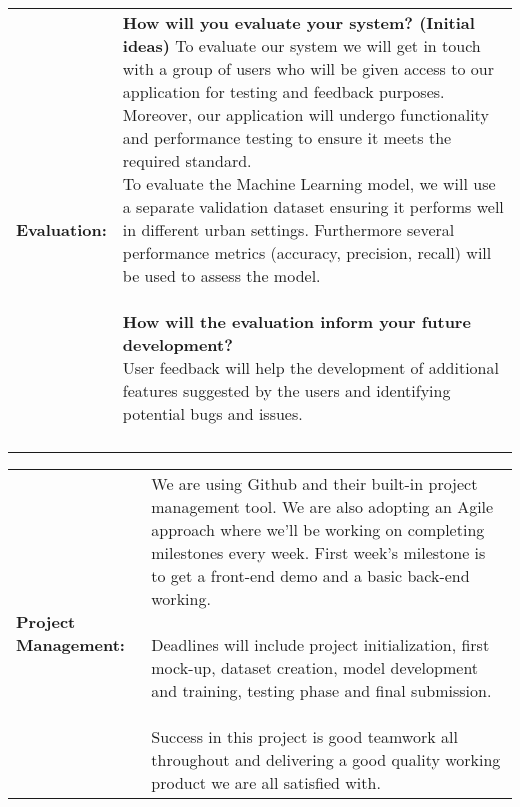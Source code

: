 \documentclass[a4paper,12pt]{article}
\begin{document}
\begin{tabular}{|p{}|p{}|}
    \hline
   \textbf{Evaluation:} & \parbox{0.65\textwidth}{\vspace{0.3cm}\textbf{How will you evaluate your system? (Initial ideas)} \vspace{0.3cm}
   To evaluate our system we will get in touch with a group of users who will be given access to our application for testing and feedback purposes. Moreover, our application will undergo functionality and performance testing to ensure it meets the required standard.
   \\
   To evaluate the Machine Learning model, we will use a separate validation dataset ensuring it performs well in different urban settings. Furthermore several performance metrics (accuracy, precision, recall) will be used to assess the model.
   \\
   \\
   \vspace{0.3cm}\textbf{ How will the evaluation inform your future development?}\vspace{0.3cm}
   \\
   User feedback will help the development of additional features suggested by the users and identifying potential bugs and issues.
   \\
   \\
    } \\
   \hline
\end{tabular}

\vspace{0.5cm}

\centering
\begin{tabular}{|p{}|p{}|}
    \hline
    \textbf{Project Management:} & \parbox{0.65\textwidth}{\vspace{0.3cm}
    We are using Github and their built-in project management tool. We are also adopting an Agile approach where we'll be working on completing milestones every week. First week's milestone is to get a front-end demo and a basic back-end working.\\ \\
    Deadlines will include project initialization, first mock-up, dataset creation, model development and training, testing phase and final submission. \\ \\
    Success in this project is good teamwork all throughout and delivering a good quality working product we are all satisfied with.
    \vspace{0.3cm}} \\
    \hline
\end{tabular}
\end{document}
